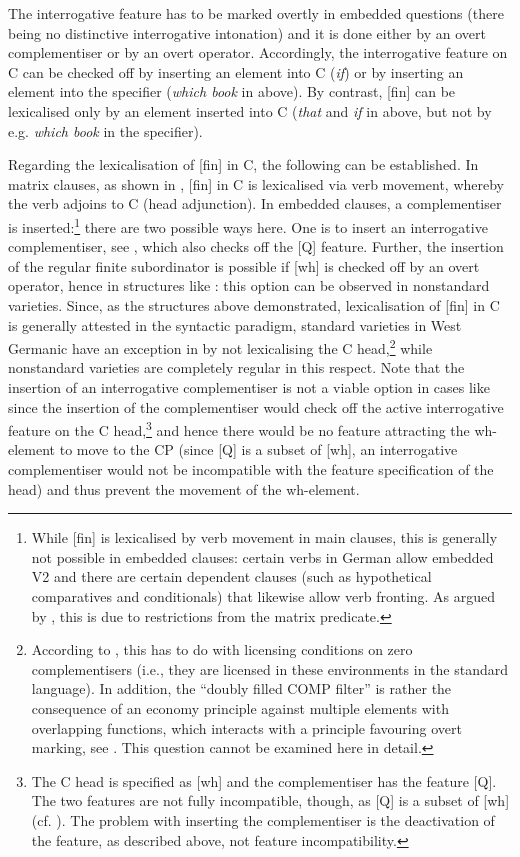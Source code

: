 \documentclass[output=paper,
modfonts, hidelinks, newtxmath
]{langscibook}
\begin{document}
\noindent The interrogative feature has to be marked overtly in embedded questions (there being no distinctive interrogative intonation) and it is done either by an overt complementiser or by an overt operator. Accordingly, the interrogative feature on C can be checked off by inserting an element into C (\textit{if}) or by inserting an element into the specifier (\textit{which book} in  above). By contrast, [fin] can be lexicalised only by an element inserted into C (\textit{that} and \textit{if} in  above, but not by e.g. \textit{which book} in the specifier).

Regarding the lexicalisation of [fin] in C, the following can be established. In matrix clauses, as shown in , [fin] in C is lexicalised via verb movement, whereby the verb adjoins to C (head adjunction). In embedded clauses, a complementiser is inserted:\footnote{While [fin] is lexicalised by verb movement in main clauses, this is generally not possible in embedded clauses: certain verbs in German allow embedded V2 and there are certain dependent clauses (such as hypothetical comparatives and conditionals) that likewise allow verb fronting. As argued by \citet{bacskaiatkaritoappear}, this is due to restrictions from the matrix predicate.} there are two possible ways here. One is to insert an interrogative complementiser, see , which also checks off the [Q] feature. Further, the insertion of the regular finite subordinator is possible if [wh] is checked off by an overt operator, hence in structures like : this option can be observed in nonstandard varieties. Since, as the structures above demonstrated, lexicalisation of [fin] in C is generally attested in the syntactic paradigm, standard varieties in West Germanic have an exception in  by not lexicalising the C head,\footnote{According to \citet{bacskaiatkaritoappear}, this has to do with licensing conditions on zero complementisers (i.e., they are licensed in these environments in the standard language). In addition, the ``doubly filled COMP filter'' is rather the consequence of an economy principle against multiple elements with overlapping functions, which interacts with a principle favouring overt marking, see \citet{vangelderen2009}. This question cannot be examined here in detail.} while nonstandard varieties are completely regular in this respect. Note that the insertion of an interrogative complementiser is not a viable option in cases like  since the insertion of the complementiser would check off the active interrogative feature on the C head,\footnote{The C head is specified as [wh] and the complementiser has the feature [Q]. The two features are not fully incompatible, though, as [Q] is a subset of [wh] (cf. \citealt{bayer2004}). The problem with inserting the complementiser is the deactivation of the feature, as described above, not feature incompatibility.} and hence there would be no feature attracting the wh-element to move to the CP (since [Q] is a subset of [wh], an interrogative complementiser would not be incompatible with the feature specification of the head) and thus prevent the movement of the wh-element.
\end{document}
